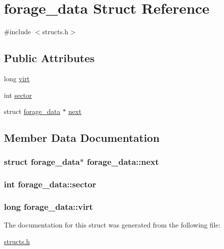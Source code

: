 \hypertarget{structforage__data}{\section{forage\-\_\-data Struct Reference}
\label{structforage__data}
}


{\ttfamily \#include $<$structs.\-h$>$}

\subsection*{Public Attributes}
\begin{DoxyCompactItemize}
\item 
long \hyperlink{structforage__data_a5842f2ec3c9c1098cedf2b6414622b9c}{virt}
\item 
int \hyperlink{structforage__data_a88cfe645d385eba299dfcd8c5a6eefe3}{sector}
\item 
struct \hyperlink{structforage__data}{forage\-\_\-data} $\ast$ \hyperlink{structforage__data_a60997418749e979e7dc569d39083e4b1}{next}
\end{DoxyCompactItemize}


\subsection{Member Data Documentation}
\hypertarget{structforage__data_a60997418749e979e7dc569d39083e4b1}{
\subsubsection[{next}]{\setlength{\rightskip}{0pt plus 5cm}struct {\bf forage\-\_\-data}$\ast$ forage\-\_\-data\-::next}}\label{structforage__data_a60997418749e979e7dc569d39083e4b1}
\hypertarget{structforage__data_a88cfe645d385eba299dfcd8c5a6eefe3}{
\subsubsection[{sector}]{\setlength{\rightskip}{0pt plus 5cm}int forage\-\_\-data\-::sector}}\label{structforage__data_a88cfe645d385eba299dfcd8c5a6eefe3}
\hypertarget{structforage__data_a5842f2ec3c9c1098cedf2b6414622b9c}{
\subsubsection[{virt}]{\setlength{\rightskip}{0pt plus 5cm}long forage\-\_\-data\-::virt}}\label{structforage__data_a5842f2ec3c9c1098cedf2b6414622b9c}


The documentation for this struct was generated from the following file\-:\begin{DoxyCompactItemize}
\item 
\hyperlink{structs_8h}{structs.\-h}\end{DoxyCompactItemize}
